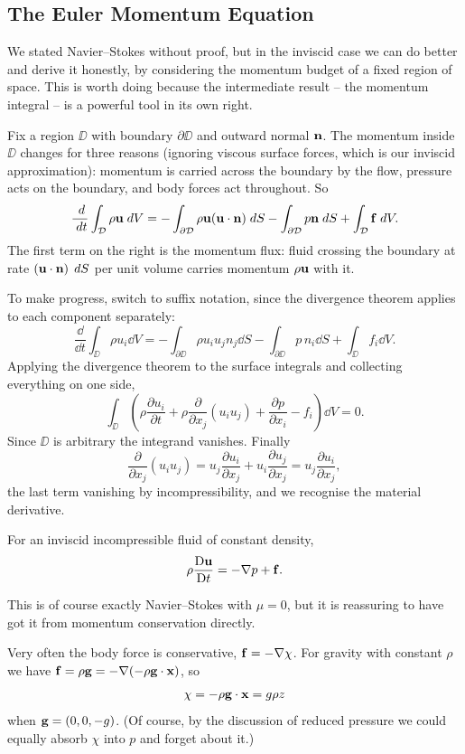 \documentclass[a4paper]{scrartcl}
\newcommand{\D}{\mathrm{D}}
\newcommand{\Dt}[1]{\frac{\D #1}{\D t}}
\newcommand{\pd}[2]{\frac{\partial #1}{\partial #2}}
\begin{document}
\subsection{The Euler Momentum Equation}

We stated Navier--Stokes without proof, but in the inviscid case we can do better and derive it honestly, by considering the momentum budget of a fixed region of space. This is worth doing because the intermediate result -- the momentum integral -- is a powerful tool in its own right.

Fix a region $\DD$ with boundary $\partial \DD$ and outward normal $\mathbf{n}$. The momentum inside $\DD$ changes for three reasons (ignoring viscous surface forces, which is our inviscid approximation): momentum is carried across the boundary by the flow, pressure acts on the boundary, and body forces act throughout. So
$$
\frac{\; d}{\; d t}\int_{\mathcal{D}} \rho \mathbf{u} \; d V = -\int_{\partial\mathcal{D}} \rho \mathbf{u} (\mathbf{u} \cdot \mathbf{n}) \; d S - \int_{\partial \mathcal{D}} p \mathbf{n} \; d S + \int_{\mathcal{D}} \mathbf{f} \; d V.
$$
The first term on the right is the momentum flux: fluid crossing the boundary at rate $(\mathbf{u} \cdot \mathbf{n})\, \; d S$ per unit volume carries momentum $\rho \mathbf{u}$ with it.

To make progress, switch to suffix notation, since the divergence theorem applies to each component separately:
$$
\frac{\dd}{\dd t} \int_\DD \rho u_i \dd V = -\int_{\partial \DD} \rho u_i u_j n_j \dd S - \int_{\partial\DD} p\, n_i \dd S + \int_\DD f_i \dd V.
$$
Applying the divergence theorem to the surface integrals and collecting everything on one side,
$$
\int_\DD \left(\rho \pd{u_i}{t} + \rho \pd{}{x_j}(u_i u_j) + \pd{p}{x_i} - f_i \right) \dd V = 0.
$$
Since $\DD$ is arbitrary the integrand vanishes. Finally
$$
\pd{}{x_j}(u_i u_j) = u_j \pd{u_i}{x_j} + u_i \pd{u_j}{x_j} = u_j \pd{u_i}{x_j},
$$
the last term vanishing by incompressibility, and we recognise the material derivative.

\begin{proposition}
	For an inviscid incompressible fluid of constant density,
	$$
	\rho \Dt{\vv u} = -\nabla p + \vv f.
	$$
\end{proposition}

This is of course exactly Navier--Stokes with $\mu = 0$, but it is reassuring to have got it from momentum conservation directly.

Very often the body force is conservative, $\mathbf{f} = -\nabla \chi$. For gravity with constant $\rho$ we have $\mathbf{f} = \rho \mathbf{g} = -\nabla(-\rho \mathbf{g} \cdot \mathbf{x})$, so
$$
\chi = -\rho \mathbf{g} \cdot \mathbf{x} = g \rho z
$$
when $\mathbf{g} = (0,0,-g)$. (Of course, by the discussion of reduced pressure we could equally absorb $\chi$ into $p$ and forget about it.)
\end{document}
